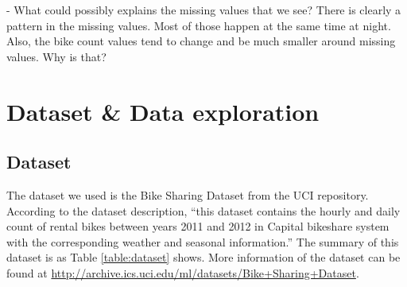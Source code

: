 \documentclass[12pt]{article}
\begin{document}
		
		- What could possibly explains the missing values that we see?
		There is clearly a pattern in the missing values. Most of those happen at the same time at night.
		Also, the bike count values tend to change and be much smaller around missing values. Why is that?
		
	
	\section{Dataset \& Data exploration}
	\subsection{Dataset}
	The dataset we used is the Bike Sharing Dataset from the UCI repository. According to the dataset description, ``this dataset contains the hourly and daily count of rental bikes between years 2011 and 2012 in Capital bikeshare system with the corresponding weather and seasonal information.''
	The summary of this dataset is as Table \ref{table:dataset} shows. More information of the dataset can be found at \url{http://archive.ics.uci.edu/ml/datasets/Bike+Sharing+Dataset}.
	
\end{document}
